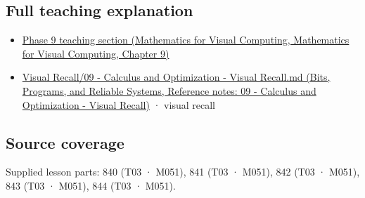 \subsection{Full teaching explanation}\label{appendix-8f96f9c4d5bc-full-teaching-explanation}

\begin{itemize}
\tightlist
\item
  \href{../02-Mathematics-for-Visual-Computing/main.pdf\#nameddest=02-foundations-ii-ch025-odes-and-numerical-simulation}{Phase 9 teaching section (Mathematics for Visual Computing, Mathematics for Visual Computing, Chapter 9)}
\item
  \href{../01-Bits-Programs-and-Reliable-Systems/main.pdf\#nameddest=appendix-adf48f5dc5c1}{Visual Recall/09 - Calculus and Optimization - Visual Recall.md (Bits, Programs, and Reliable Systems, Reference notes: 09 - Calculus and Optimization - Visual Recall)} · visual recall
\end{itemize}

\subsection{Source coverage}\label{appendix-8f96f9c4d5bc-source-coverage}

Supplied lesson parts: 840 (T03 · M051), 841 (T03 · M051), 842 (T03 · M051), 843 (T03 · M051), 844 (T03 · M051).
